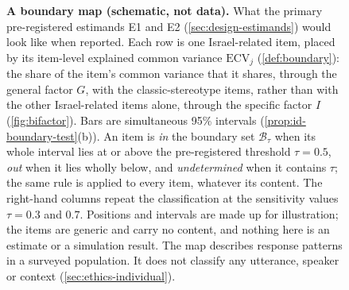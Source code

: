 \begin{figure}[t]
\caption{\textbf{A boundary map (schematic, not data).} What the primary
pre-registered estimands E1 and E2 (\cref{sec:design-estimands})
would look like when reported. Each row is one Israel-related item, placed by
its item-level explained common variance $\mathrm{ECV}_j$
(\cref{def:boundary}): the share of the item's common variance that it shares,
through the general factor $G$, with the classic-stereotype items, rather than
with the other Israel-related items alone, through the specific factor $I$
(\cref{fig:bifactor}). Bars are simultaneous 95\% intervals (\cref{prop:id-boundary-test}(b)). An item is \emph{in} the
boundary set $\mathcal{B}_\tau$ when its whole interval lies at or above the
pre-registered threshold $\tau=0.5$, \emph{out} when it lies wholly below,
and \emph{undetermined} when it contains $\tau$; the same rule is applied to
every item, whatever its content. The right-hand columns repeat the
classification at the sensitivity values $\tau=0.3$ and $0.7$. Positions and
intervals are made up for illustration; the items are generic and carry no
content, and nothing here is an estimate or a simulation result. The map
describes response patterns in a surveyed population. It does not classify
any utterance, speaker or context (\cref{sec:ethics-individual}).}
\label{fig:boundary}
\end{figure}
